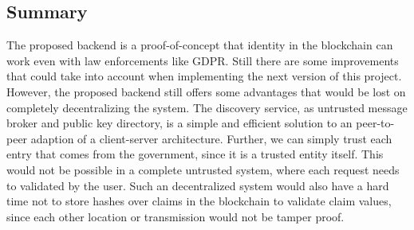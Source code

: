 \subsection{Summary}
The proposed backend is a proof-of-concept that identity in the blockchain can work even with law enforcements like GDPR. Still there are some improvements that could take into account when implementing the next version of this project. However, the proposed backend still offers some advantages that would be lost on completely decentralizing the system. The discovery service, as untrusted message broker and public key directory, is a simple and efficient solution to an peer-to-peer adaption of a client-server architecture. Further, we can simply trust each entry that comes from the government, since it is a trusted entity itself. This would not be possible in a complete untrusted system, where each request needs to validated by the user. Such an decentralized system would also have a hard time not to store hashes over claims in the blockchain to validate claim values, since each other location or transmission would not be tamper proof. 
